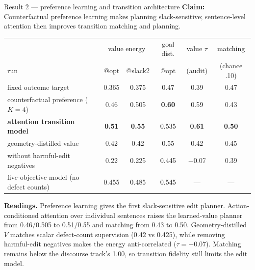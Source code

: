 \documentclass[aspectratio=169,10pt]{beamer}
\newcommand{\claim}[1]{\textcolor{cviolet}{\textbf{Claim:} #1}}
\begin{document}
\begin{frame}{Result 2 --- preference learning and transition architecture}
\claim{Counterfactual preference learning makes planning slack-sensitive;
sentence-level attention then improves transition matching and planning.}
\centering\scriptsize
\begin{tabular}{lccccc}
\toprule
 & \multicolumn{2}{c}{value energy} & goal dist. & value $\tau$ & matching\\
run & @opt & @slack2 & @opt & (audit) & (chance .10)\\
\midrule
fixed outcome target & 0.365 & 0.375 & 0.47 & 0.39 & 0.47\\
counterfactual preference ($K=4$) & 0.46 & 0.505 & \textbf{0.60}
 & 0.59 & 0.43\\
\textbf{attention transition model} & \textbf{0.51} & \textbf{0.55} & 0.535
 & \textbf{0.61} & \textbf{0.50}\\
geometry-distilled value & 0.42 & 0.42 & 0.55 & 0.42 & 0.45\\
without harmful-edit negatives & 0.22 & 0.225 & 0.445 & $-$0.07 & 0.39\\
five-objective model (no defect counts) & 0.455 & 0.485 & 0.545 & --- & ---\\
\bottomrule
\end{tabular}

\medskip\small
\textbf{Readings.} Preference learning gives the first slack-sensitive edit
planner. Action-conditioned attention over individual sentences raises the
learned-value planner from 0.46/0.505 to 0.51/0.55 and matching from 0.43 to
0.50. Geometry-distilled $V$ matches scalar defect-count supervision (0.42 vs
0.425), while removing harmful-edit negatives makes the energy anti-correlated
($\tau=-0.07$). Matching remains below the discourse track's 1.00, so transition
fidelity still limits the edit model.
\end{frame}
\end{document}
